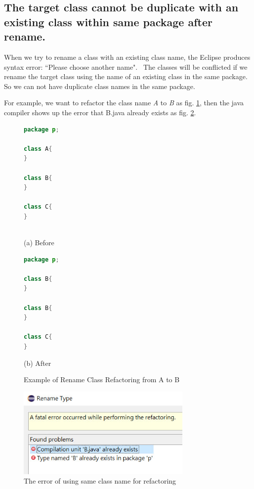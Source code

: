 \subsection{The target class cannot be duplicate with an existing class within same package after rename.}

When we try to rename a class with an existing class name, the Eclipse produces syntax error:
``Please choose another name".~\cite{EclipseWebPage} The classes will be conflicted if we rename the target class using the name of an existing class in the same package. So we can not have duplicate class names in the same package. 

For example, we want to refactor the class name \textsl{A} to \textsl{B} as fig. \ref{fig:afterrr}, then the java compiler shows up the error that B.java already exists as fig. \ref{fig:renameclassname}.

\begin{figure}[th]
\centering
\begin{minipage}[t]{0.45\linewidth}
\begin{lstlisting}[language=java, basicstyle=\scriptsize\ttfamily,frame=single]
package p;

class A{
}
	
class B{
}

class C{
}
 
\end{lstlisting}
\tiny{(a) Before}
\end{minipage}
\hfill
\begin{minipage}[t]{0.45\linewidth}
\begin{lstlisting}[language=java, basicstyle=\scriptsize\ttfamily,frame=single]
package p;

class B{
}	

class B{
}

class C{
}

\end{lstlisting}
\tiny{(b) After}
\end{minipage}
\caption{Example of Rename Class Refactoring from A to B}
\label{fig:afterrr}
\end{figure}

\begin{figure}[H]
\centerline{\includegraphics[width=85mm,scale=0.5]{SCN.jpg}}
\caption{The error of using same class name for refactoring}
\label{fig:renameclassname}
\end{figure}


